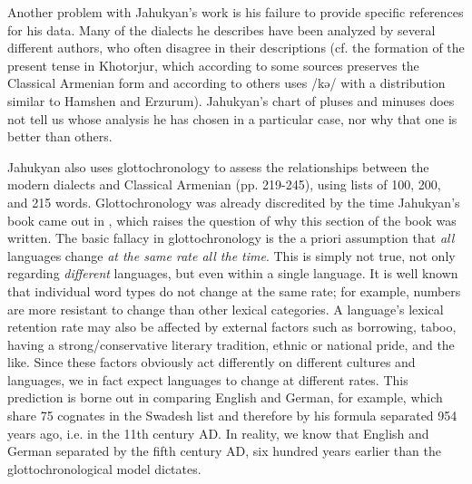 \documentclass[output=paper]{langscibook}
\begin{document}
Another problem with Jahukyan's work is his failure to provide specific references for his data. Many of the dialects he describes have been analyzed by several different authors, who often disagree in their descriptions (cf. the formation of the present tense in Khotorjur, which according to some sources preserves the Classical Armenian form and according to others uses /kə/ with a distribution similar to Hamshen and Erzurum). Jahukyan's chart of pluses and minuses does not tell us whose analysis he has chosen in a particular case, nor why that one is better than others.

Jahukyan also uses glottochronology to assess the relationships between the modern dialects and Classical Armenian (pp. 219-245), using lists of 100, 200, and 215 words. Glottochronology was already discredited by the time Jahukyan's book came out in \citeyear{Jahukyan-1972-ArmenianDiaolectology} \citep[cf.][]{Gudschinsky-1956-Threedisturbingquestionsconcerninglexicostatistics,SjobergSjoberg-1956-ProblemsGlottochronology,Taylor-1961-particularproblemsapplication100itemlexicostatistictestlist,Blust-2000-Whylexicostatisticsdoesnwork,Matisoff-2000-uselessnessglottochronologysubgroupingTibetoBurman,McMahonMcMahon-2000-Problemsdatingtimedepthlinguisticsbiology}, which raises the question of why this section of the book was written. The basic fallacy in glottochronology is the a priori assumption that \textit{all} languages change \textit{at the same rate all the time}. This is simply not true, not only regarding \textit{different} languages, but even within a single language. It is well known that individual word types do not change at the same rate; for example, numbers are more resistant to change than other lexical categories. A language's lexical retention rate may also be affected by external factors such as borrowing, taboo, having a strong\slash conservative literary tradition, ethnic or national pride, and the like. Since these factors obviously act differently on different cultures and languages, we in fact expect languages to change at different rates. This prediction is borne out in comparing English and German, for example, which share 75 cognates in the Swadesh list and therefore by his formula separated 954 years ago, i.e. in the 11th century AD. In reality, we know that English and German separated by the fifth century AD, six hundred years earlier than the glottochronological model dictates. 
\end{document}
